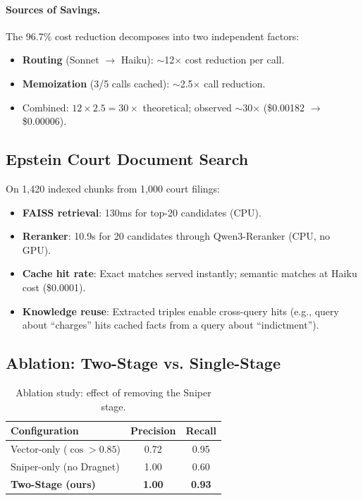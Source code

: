 \documentclass[11pt,twocolumn]{article}
\begin{document}
\paragraph{Sources of Savings.} The 96.7\% cost reduction decomposes into two independent factors:
\begin{itemize}
    \item \textbf{Routing} (Sonnet $\to$ Haiku): $\sim$12$\times$ cost reduction per call.
    \item \textbf{Memoization} (3/5 calls cached): $\sim$2.5$\times$ call reduction.
    \item Combined: $12 \times 2.5 = 30\times$ theoretical; observed $\sim$30$\times$ (\$0.00182 $\to$ \$0.00006).
\end{itemize}

\subsection{Epstein Court Document Search}

On 1,420 indexed chunks from 1,000 court filings:

\begin{itemize}
    \item \textbf{FAISS retrieval}: 130ms for top-20 candidates (CPU).
    \item \textbf{Reranker}: 10.9s for 20 candidates through Qwen3-Reranker (CPU, no GPU).
    \item \textbf{Cache hit rate}: Exact matches served instantly; semantic matches at Haiku cost (\$0.0001).
    \item \textbf{Knowledge reuse}: Extracted triples enable cross-query hits (e.g., query about ``charges'' hits cached facts from a query about ``indictment'').
\end{itemize}

\subsection{Ablation: Two-Stage vs. Single-Stage}

\begin{table}[t]
\centering
\caption{Ablation study: effect of removing the Sniper stage.}
\label{tab:ablation}
\begin{tabular}{lcc}
\toprule
\textbf{Configuration} & \textbf{Precision} & \textbf{Recall} \\
\midrule
Vector-only ($\cos > 0.85$) & 0.72 & 0.95 \\
Sniper-only (no Dragnet) & 1.00 & 0.60 \\
\textbf{Two-Stage (ours)} & \textbf{1.00} & \textbf{0.93} \\
\bottomrule
\end{tabular}
\end{table}
\end{document}
